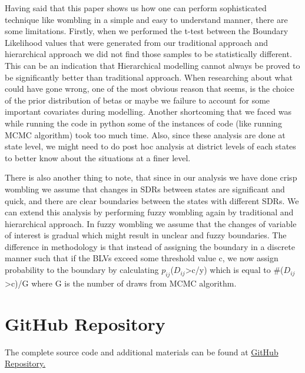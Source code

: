 \documentclass[enabledeprecatedfontcommands,parskip=half,twoside=semi,BCOR=0mm]{scrreprt}
\numberwithin{equation}{chapter}
\theoremstyle{definition}
\theoremstyle{remark}
\begin{document}
    Having said that this paper shows us how one can perform sophisticated technique like wombling in a simple and easy to understand manner, there are some limitations. Firstly, when we performed the t-test between the Boundary Likelihood values that were generated from our traditional approach and hierarchical approach we did not find those samples to be statistically different. This can be an indication that Hierarchical modelling cannot always be proved to be significantly better than traditional approach. When researching about what could have gone wrong, one of the most obvious reason that seems, is the choice of the prior distribution of betas or maybe we failure to account for some important covariates during modelling. Another shortcoming that we faced was while running the code in python some of the instances of code (like running MCMC algorithm) took too much time. Also, since these analysis are done at state level, we might need to do post hoc analysis at district levels of each states to better know about the situations at a finer level. 
    
    There is also another thing to note, that since in our analysis we have done crisp wombling we assume that changes in SDRs between states are significant and quick, and there are clear boundaries between the states with different SDRs. We can extend this analysis by performing fuzzy wombling again by traditional and hierarchical approach. In fuzzy wombling we assume that the changes of variable of interest is gradual which might result in unclear and fuzzy boundaries. The difference in methodology is that instead of assigning the boundary in a discrete manner such that if the BLVs exceed some threshold value c, we now assign probability to the boundary by calculating \(p_{ij}\)(\(D_{ij}\)>c/y) which is equal to \#(\(D_{ij}\)>c)/G where G is the number of draws from MCMC algorithm.

   \appendix
    \chapter{GitHub Repository}
    The complete source code and additional materials can be found at \href{https://github.com/SameerR007/ArealWombling_Project}{GitHub Repository.}
    
    \newpage
    \printbibliography
\end{document}
